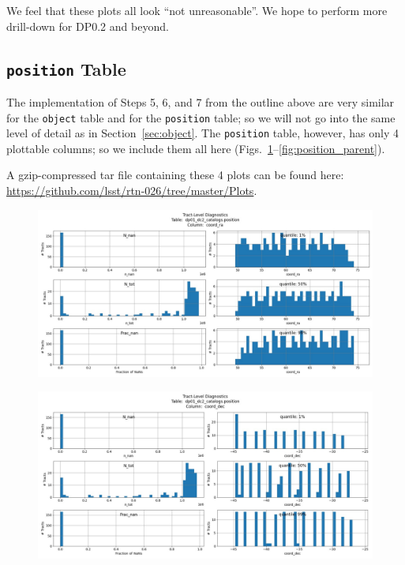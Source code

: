\documentclass[DM,authoryear,toc]{lsstdoc}
\begin{document}
We feel that these plots all look ``not unreasonable''.  We hope to
perform more drill-down for DP0.2 and beyond.


\subsection{\texttt{position} Table} \label{sec:position}

The implementation of Steps 5, 6, and 7 from the outline above are
very similar for the \texttt{object} table and for the
\texttt{position} table; so we will not go into the same
level of detail as in Section~\ref{sec:object}.  The \texttt{position}
table, however, has only 4 plottable columns; so we include them all here
(Figs.~\ref{fig:position_coord_ra}--\ref{fig:position_parent}).

A gzip-compressed tar file containing these 4 plots can be found here:
\url{https://github.com/lsst/rtn-026/tree/master/Plots}.

\begin{figure}[h]
\centering
\includegraphics[width=1.0\linewidth]{Plots/TAP_verify_DP01.dp01_dc2_catalogs.position.coord_ra.pdf}
\caption{}
\label{fig:position_coord_ra}
\end{figure}

\begin{figure}[h]
\centering
\includegraphics[width=1.0\linewidth]{Plots/TAP_verify_DP01.dp01_dc2_catalogs.position.coord_dec.pdf}
\caption{}
\label{fig:position_coord_dec}
\end{figure}
\end{document}
